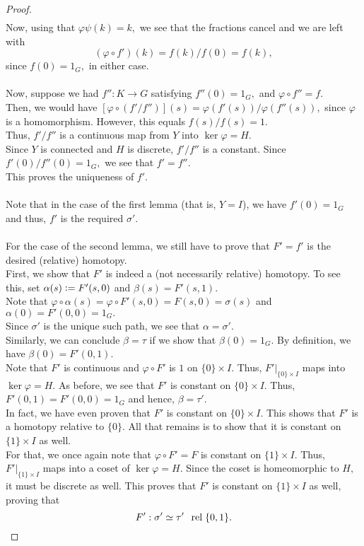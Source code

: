 \documentclass[12pt]{article}
\theoremstyle{definition}
\numberwithin{thm}{section}
\newcommand{\rel}{\;\;\operatorname{rel}\;}
\begin{document}
\begin{proof}
\begin{align*}
 	\end{align*}
 	Now, using that $\varphi\psi(k) = k,$ we see that the fractions cancel and we are left with
 	\begin{equation*} 
 		(\varphi\circ f')(k) = f(k)/f(0) = f(k),
 	\end{equation*}
 	since $f(0) = 1_G,$ in either case.\\~\\
 	Now, suppose we had $f'': K \to G$ satisfying $f''(0) = 1_G,$ and $\varphi\circ f'' = f.$\\
 	Then, we would have $[\varphi\circ(f'/f'')](s) = \varphi(f'(s))/\varphi(f''(s)),$ since $\varphi$ is a homomorphism. However, this equals $f(s)/f(s) = 1.$\\
 	Thus, $f'/f''$ is a continuous map from $Y$ into $\ker\varphi = H.$\\
 	Since $Y$ is connected and $H$ is discrete, $f'/f''$ is a constant. Since $f'(0)/f''(0) = 1_G,$ we see that $f' = f''.$\\
 	This proves the uniqueness of $f'.$\\~\\
 	Note that in the case of the first lemma (that is, $Y = I$), we have $f'(0) = 1_G$ and thus, $f'$ is the required $\sigma'.$\\~\\
 	For the case of the second lemma, we still have to prove that $F' = f'$ is the desired (relative) homotopy.\\
 	First, we show that $F'$ is indeed a (not necessarily relative) homotopy. To see this, set $\alpha(s) \vcentcolon= F'(s, 0)$ and $\beta(s) = F'(s, 1).$\\
 	Note that $\varphi\circ \alpha(s) = \varphi \circ F'(s, 0) = F(s, 0) = \sigma(s)$ and $\alpha(0) = F'(0, 0) = 1_G.$ \\
 	Since $\sigma'$ is the unique such path, we see that $\alpha = \sigma'.$\\
 	Similarly, we can conclude $\beta = \tau$ if we show that $\beta(0) = 1_G.$ By definition, we have $\beta(0) = F'(0, 1).$ \\
 	Note that $F'$ is continuous and $\varphi \circ F'$ is $1$ on $\{0\} \times I.$ Thus, $F'|_{\{0\} \times I}$ maps into $\ker \varphi = H.$ As before, we see that $F'$ is constant on $\{0\} \times I.$ Thus, $F'(0, 1) = F'(0, 0) = 1_G$ and hence, $\beta = \tau'.$\\
 	In fact, we have even proven that $F'$ is constant on $\{0\} \times I.$ This shows that $F'$ is a homotopy relative to $\{0\}.$ All that remains is to show that it is constant on $\{1\} \times I$ as well.\\
 	For that, we once again note that $\varphi\circ F' = F$ is constant on $\{1\}\times I.$ Thus, $F'|_{\{1\}\times I}$ maps into a coset of $\ker \varphi = H.$ Since the coset is homeomorphic to $H,$ it must be discrete as well. This proves that $F'$ is constant on $\{1\} \times I$ as well, proving that
 	\begin{equation*} 
 		F' : \sigma' \simeq \tau' \rel \{0, 1\}. \qedhere
 	\end{equation*}
 \end{proof} 
\end{document}
